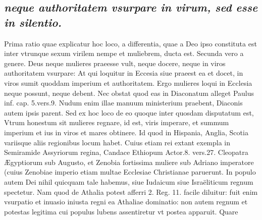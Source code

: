 \documentclass{article}
\begin{document}
\begin{pages}
\subsection*{\textit{neque authoritatem vsurpare in virum, sed esse in silentio. }}\pstart Prima ratio quae explicatur hoc loco, a differentia, quae a Deo ipso constituta est inter vtrunque sexum virilem nempe et muliebrem, ducta est. Secunda vero a genere. Deus neque mulieres praeesse vult, neque docere, neque  in viros authoritatem vsurpare: At qui loquitur in Eccesia siue praeest ea et docet, in viros sumit quoddam imperium et authoritatem. Ergo mulieres loqui in Ecclesia neque possunt, neque debent. Nec obstat quod eas in Diaconatum alleget Paulus inf. cap. 5.vers.9. Nudum enim illae manuum ministerium praebent, Diaconis autem ipsis parent. Sed ex hoc loco de eo quoque inter quosdam disputatum est, Vtrum honestum sit mulieres regnare, id est, viris imperare, et summum imperium et ius in viros et mares obtinere. Id quod in Hispania, Anglia, Scotia variisque aliis regionibus locum habet. Cuius etiam rei extant exempla in Semiramide Assyriorum regina, Candace Ethiopum Actor.8. vers.27. Cleopatra Ægyptiorum sub Augusto, et Zenobia fortissima muliere sub Adriano imperatore (cuius Zenobiae imperio etiam multae Ecclesiae Christianae paruerunt. In populo autem Dei nihil quicquam tale habemus, siue Iudaicum siue Israëliticum regnum spectetur. Nam quod de Athalia potest afferri 2. Reg. 11. facile diluitur: fuit enim vsurpatio et inuasio iniusta regni ea Athaliae dominatio: non autem regnum et potestas legitima cui populus lubens assentiretur vt postea apparuit. Quare  \pend

\end{pages}
\end{document}
